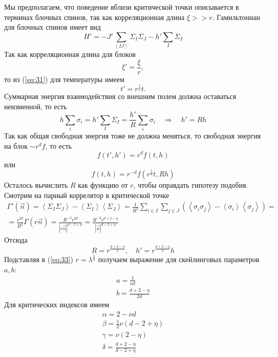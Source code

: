 \documentclass[a4paper,12pt]{article}
\theoremstyle{definition}
\theoremstyle{definition}
\theoremstyle{definition}
\begin{document}
Мы предполагаем, что поведение вблизи критической точки описывается в терминах блочных спинов, так как корреляционная длина $\xi>>r$. Гамильтониан для блочных спинов имеет вид
\begin{equation}
  \label{eq:42}
  H'=-J' \sum_{\left<IJ\right>} \Sigma_I \Sigma_J-h' \sum_I \Sigma_I
\end{equation}
Так как корреляционная длина для блоков
\begin{equation}
  \label{eq:43}
  \xi'=\frac{\xi}{r},
\end{equation}
то из (\ref{eq:31}) для температуры имеем
\begin{equation}
  \label{eq:44}
  t'=r^{\frac{1}{\nu}} t.
\end{equation}
Суммарная энергия взаимодействия со внешним полем должна оставаться неизменной, то есть
\begin{equation}
  \label{eq:45}
  h\sum_i \sigma_i=h' \sum_I \Sigma_I=\frac{h'}{R}\sum_i \sigma_i\quad\Longrightarrow\quad h'= Rh
\end{equation}
Так как общая свободная энергия тоже не должна меняться, то свободная энергия на блок $\sim r^d f$, то есть
\begin{equation}
  \label{eq:46}
  f(t',h')=r^d f(t,h)
\end{equation}
или
\begin{equation}
  \label{eq:47}
  f(t,h)=r^{-d} f(r^{\frac{1}{\nu}} t, Rh)
\end{equation}
Осталось вычислить $R$ как функцию от $r$, чтобы оправдать гипотезу подобия. Смотрим на парный коррелятор в критической точке
\begin{multline}
  \label{eq:48}
  \Gamma'(\vec n)=\left< \Sigma_I\Sigma_J\right>-\left< \Sigma_I\right>\left<\Sigma_J\right>=\frac{1}{R^2}\sum_{i\in I}\sum_{j\in J}\left(\left<\sigma_i \sigma_j\right>-\left<\sigma_i\right>\left<\sigma_j\right>\right) =\\
  = \frac{r^{2d}}{R^2}\Gamma(r\vec n)=\frac{R^{-2}r^{2d}}{\left|r\vec n\right|^{d-2+\eta}}=\frac{R^{-2}r^{d+2-\eta}}{\left|\vec n\right|^{d-2+\eta}}
\end{multline}
Отсюда
\begin{equation}
  \label{eq:49}
  R=r^{\frac{d+2-\eta}{2}}, \quad h'=r^{\frac{d+2-\eta}{2}}h
\end{equation}
Подставляя в (\ref{eq:33}) $r=\lambda^{\frac{1}{d}}$ получаем выражение для скейлинговых параметров $a,b$:
\begin{eqnarray}
  \label{eq:50}
  a=\frac{1}{\nu d}\\
  b=\frac{d+2-\eta}{2d}
\end{eqnarray}
Для критических индексов имеем
\begin{eqnarray}
  \label{eq:51}
  \alpha=2-\nu d\\
  \beta=\frac{1}{2}\nu (d-2+\eta)\\
  \gamma=\nu (2-\eta)\\
  \delta=\frac{d+2-\eta}{d-2+\eta}
\end{eqnarray}
\end{document}
